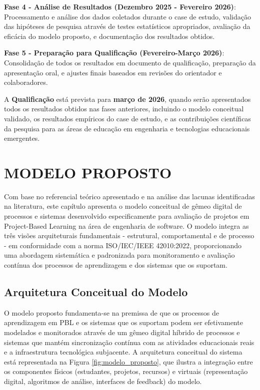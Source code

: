 \documentclass[12pt,a4paper]{article}
\begin{document}
\textbf{Fase 4 - Análise de Resultados (Dezembro 2025 - Fevereiro 2026)}: Processamento e análise dos dados coletados durante o case de estudo, validação das hipóteses de pesquisa através de testes estatísticos apropriados, avaliação da eficácia do modelo proposto, e documentação dos resultados obtidos.

\textbf{Fase 5 - Preparação para Qualificação (Fevereiro-Março 2026)}: Consolidação de todos os resultados em documento de qualificação, preparação da apresentação oral, e ajustes finais baseados em revisões do orientador e colaboradores.

A \textbf{Qualificação} está prevista para \textbf{março de 2026}, quando serão apresentados todos os resultados obtidos nas fases anteriores, incluindo o modelo conceitual validado, os resultados empíricos do case de estudo, e as contribuições científicas da pesquisa para as áreas de educação em engenharia e tecnologias educacionais emergentes.

\section{MODELO PROPOSTO}

Com base no referencial teórico apresentado e na análise das lacunas identificadas na literatura, este capítulo apresenta o modelo conceitual de gêmeo digital de processos e sistemas desenvolvido especificamente para avaliação de projetos em Project-Based Learning na área de engenharia de software. O modelo integra as três visões arquiteturais fundamentais - estrutural, comportamental e de processo - em conformidade com a norma ISO/IEC/IEEE 42010:2022, proporcionando uma abordagem sistemática e padronizada para monitoramento e avaliação contínua dos processos de aprendizagem e dos sistemas que os suportam.

\subsection{Arquitetura Conceitual do Modelo}

O modelo proposto fundamenta-se na premissa de que os processos de aprendizagem em PBL e os sistemas que os suportam podem ser efetivamente modelados e monitorados através de um gêmeo digital híbrido de processos e sistemas que mantém sincronização contínua com as atividades educacionais reais e a infraestrutura tecnológica subjacente. A arquitetura conceitual do sistema está representada na Figura \ref{fig:modelo_proposto}, que ilustra a integração entre os componentes físicos (estudantes, projetos, recursos) e virtuais (representação digital, algoritmos de análise, interfaces de feedback) do modelo.
\end{document}
